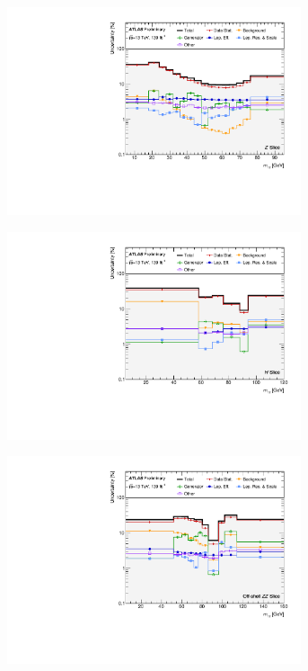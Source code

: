 \begin{figure}[hp]
    \centering
    \begin{subfigure}{.49\textwidth}\centering\includegraphics[width = 0.95\textwidth]{Figures/m4l/Systematics/Unfolded/UnfoldedSys_m12_vs_M4l_Stack_Paper0.pdf}\end{subfigure}
    \begin{subfigure}{.49\textwidth}\centering\includegraphics[width = 0.95\textwidth]{Figures/m4l/Systematics/Unfolded/UnfoldedSys_m12_vs_M4l_Stack_Paper1.pdf}\end{subfigure}
    \begin{subfigure}{.49\textwidth}\centering\includegraphics[width = 0.95\textwidth]{Figures/m4l/Systematics/Unfolded/UnfoldedSys_m12_vs_M4l_Stack_Paper2.pdf}\end{subfigure}

\end{figure}
